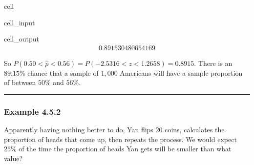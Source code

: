 \documentclass[letterpaper,10pt,english]{jupyterBook}
\begin{document}
\begin{sphinxuseclass}{cell}\begin{sphinxVerbatimInput}

\begin{sphinxuseclass}{cell_input}
\begin{sphinxVerbatim}[commandchars=\\\{\}]
\end{sphinxVerbatim}

\end{sphinxuseclass}\end{sphinxVerbatimInput}
\begin{sphinxVerbatimOutput}

\begin{sphinxuseclass}{cell_output}\begin{equation*}
\begin{split}0.891530480654169\end{split}
\end{equation*}
\end{sphinxuseclass}\end{sphinxVerbatimOutput}

\end{sphinxuseclass}
\sphinxAtStartPar
So \(P(0.50 < \hat{p} < 0.56) = P(-2.5316 < z < 1.2658) = 0.8915\). There is an \(89.15\%\) chance that a sample of \(1{,}000\) Americans will have a sample proportion of between \(50\%\) and \(56\%\).


\bigskip\hrule\bigskip



\subsubsection{Example 4.5.2}
\label{\detokenize{Ch4 The Normal Distribution and the Central Limit Theorem/4.5 The Central Limit Theorem for Proportions:example-4-5-2}}
\sphinxAtStartPar
Apparently having nothing better to do, Yan flips \(20\) coins, calculates the proportion of heads that come up, then repeats the process. We would expect \(25\%\) of the time the proportion of heads Yan gets will be smaller than what value?
\end{document}
